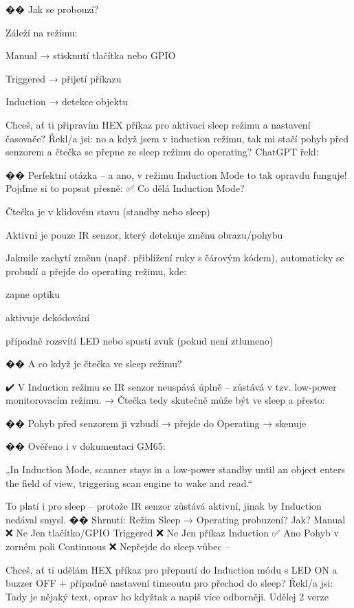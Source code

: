 �� Jak se probouzí?

Záleží na režimu:

    Manual → stisknutí tlačítka nebo GPIO

    Triggered → přijetí příkazu

    Induction → detekce objektu

Chceš, ať ti připravím HEX příkaz pro aktivaci sleep režimu a nastavení časovače?
Řekl/a jsi:
no a když jsem v induction režimu, tak mi stačí pohyb před senzorem a čtečka se přepne ze sleep režimu do operating?
ChatGPT řekl:

�� Perfektní otázka – a ano, v režimu Induction Mode to tak opravdu funguje!
Pojďme si to popsat přesně:
✅ Co dělá Induction Mode?

    Čtečka je v klidovém stavu (standby nebo sleep)

    Aktivní je pouze IR senzor, který detekuje změnu obrazu/pohybu

    Jakmile zachytí změnu (např. přiblížení ruky s čárovým kódem), automaticky se probudí a přejde do operating režimu, kde:

        zapne optiku

        aktivuje dekódování

        případně rozsvítí LED nebo spustí zvuk (pokud není ztlumeno)

�� A co když je čtečka ve sleep režimu?

✔️ V Induction režimu se IR senzor neuspává úplně – zůstává v tzv. low-power monitorovacím režimu.
→ Čtečka tedy skutečně může být ve sleep a přesto:

    �� Pohyb před senzorem ji vzbudí → přejde do Operating → skenuje

�� Ověřeno i v dokumentaci GM65:

    „In Induction Mode, scanner stays in a low-power standby until an object enters the field of view, triggering scan engine to wake and read.“

To platí i pro sleep – protože IR senzor zůstává aktivní, jinak by Induction nedával smysl.
�� Shrnutí:
Režim	Sleep → Operating probuzení?	Jak?
Manual	❌ Ne	Jen tlačítko/GPIO
Triggered	❌ Ne	Jen příkaz
Induction	✅ Ano	Pohyb v zorném poli
Continuous	❌ Nepřejde do sleep vůbec	–

Chceš, ať ti udělám HEX příkaz pro přepnutí do Induction módu s LED ON a buzzer OFF + případně nastavení timeoutu pro přechod do sleep?
Řekl/a jsi:
Tady je nějaký text, oprav ho kdyžtak a napiš více odborněji. Udělej 2 verze

